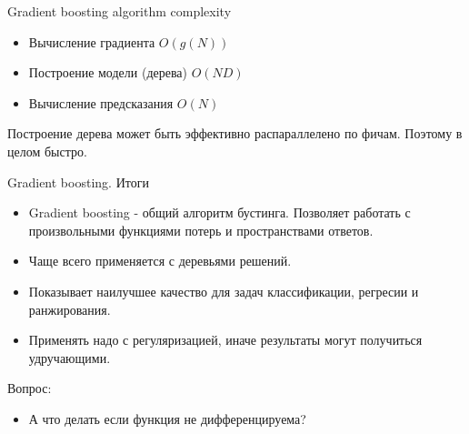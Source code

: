 \documentclass[10pt]{beamer}
\begin{document}
\begin{frame}{Gradient boosting algorithm complexity}
\begin{itemize}
    \item Вычисление градиента $O(g(N))$ 
    \item Построение модели (дерева) $O(ND)$
    \item Вычисление предсказания $O(N)$
\end{itemize}

\vspace{1em}
Построение дерева может быть эффективно распараллелено по фичам. Поэтому в
целом быстро.
\end{frame}

\begin{frame}{Gradient boosting. Итоги}
\begin{itemize}
    \item Gradient boosting - общий алгоритм бустинга. Позволяет работать с
        произвольными функциями потерь и пространствами ответов.
    \item Чаще всего применяется с деревьями решений.
    \item Показывает наилучшее качество для задач классификации, регресии и
        ранжирования.
    \item Применять надо с регуляризацией, иначе результаты могут получиться
        удручающими.
\end{itemize}
\begin{block}{Вопрос:}
\end{block}
\begin{itemize}
    \item А что делать если функция не дифференцируема?
\end{itemize}
\end{frame}
\end{document}
